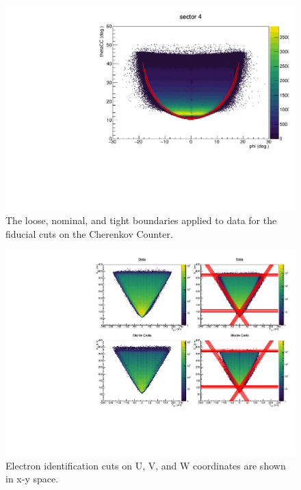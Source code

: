\begin{figure}
  \centering
  \includegraphics[width=\textwidth]{image/plots/sidis/systematics/cc_fid.pdf}
  \caption[Systematic variations of the CC fiducial cut for electrons.]{The loose, nominal, and tight boundaries applied to data for the fiducial cuts on the Cherenkov Counter.}
    \label{fig:systematics-cc-fid}

\end{figure}

\begin{figure}
  \centering
  \includegraphics[width=\textwidth]{image/plots/sidis/systematics/ec_fid_sect1.pdf}
  \caption[Variation of EC U, V, and W cuts used to identify electrons.]{Electron identification cuts on U, V, and W coordinates are shown in x-y space.}
    \label{fig:systematics-ec-fid}

\end{figure}

